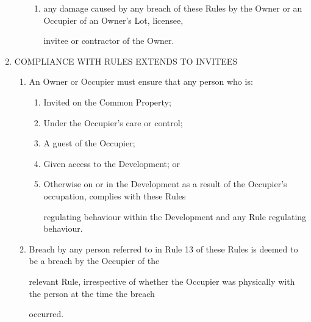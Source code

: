 \documentclass{article}
\begin{document}
\begin{enumerate}[label=\arabic*.]
\begin{enumerate}[label=\arabic{enumi}.\arabic*.]
\begin{enumerate}[label=(\arabic*)]
\item {\fontsize{9.962}{1} any damage caused by any breach of these Rules by the Owner or an Occupier of an Owner’s Lot, licensee, }

{\fontsize{10.02}{1}invitee or contractor of the Owner. }

\end{enumerate}
\end{enumerate}
\item {\fontsize{9.99}{1} COMPLIANCE WITH RULES EXTENDS TO INVITEES }

\begin{enumerate}[label=\arabic{enumi}.\arabic*.]
\item {\fontsize{9.99}{1} An Owner or Occupier must ensure that any person who is: }

\begin{enumerate}[label=(\arabic*)]
\item {\fontsize{9.962}{1} Invited on the Common Property; }

\item {\fontsize{9.962}{1} Under the Occupier’s care or control; }

\item {\fontsize{9.962}{1} A guest of the Occupier; }

\item {\fontsize{9.962}{1} Given access to the Development; or }

\item {\fontsize{9.962}{1} Otherwise on or in the Development as a result of the Occupier’s occupation, complies with these Rules }

{\fontsize{10.02}{1}regulating behaviour within the Development and any Rule regulating behaviour. }

\end{enumerate}
\item {\fontsize{9.99}{1} Breach by any person referred to in Rule 13 of these Rules is deemed to be a breach by the Occupier of the }

{\fontsize{10.02}{1}relevant Rule, irrespective of whether the Occupier was physically with the person at the time the breach }

{\fontsize{10.02}{1}occurred. }

\end{enumerate}
\end{enumerate}
\end{document}
